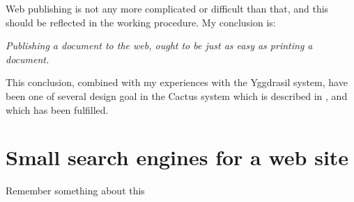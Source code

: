 Web publishing is not any more complicated or difficult than that, and
this should be reflected in the working procedure.  My conclusion is:

\begin{center}
  \textit{Publishing a document to the web, ought to be just
    as easy as printing a document.}
\end{center}

This conclusion, combined with my experiences with the Yggdrasil
system, have been one of several design goal in the Cactus system
which is described in , and which has been
fulfilled.



\section{Small search engines for a web site}
\label{sec:search-engines}

\textsf{Remember something about this}

